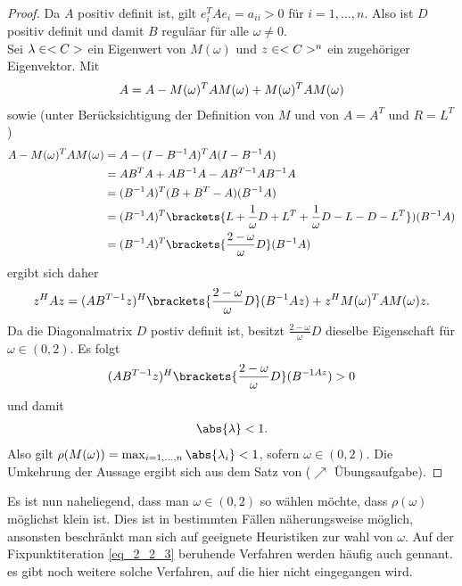 \begin{proof}
	Da $A$ positiv definit ist, gilt $e_i^TA e_i = a_{ii} > 0$ für $i = 1, \dots, n$. Also ist $D$ positiv definit und damit $B$ reguläar für alle $\omega \neq 0$.\\
	Sei $\lambda \in <C>$ ein Eigenwert von $M(\omega)$ und $z \in <C>^n$ ein zugehöriger Eigenvektor. Mit
	\begin{align}
		A = A - M(\omega)^T AM(\omega) + M(\omega)^T AM(\omega) \notag
	\end{align}
	sowie (unter Berücksichtigung der Definition von $M$ und von $A = A^T$ und $R = L^T$)
	\begin{align}
	A - M(\omega)^T AM(\omega) 
	&= A - (I - B^{-1}A)^T A(I-B^{-1}A)\notag\\
	&= AB^T A + AB^{-1}A - AB^{T-1}AB^{-1}A\notag\\
	&= (B^{-1}A)^T (B + B^T - A)(B^{-1}A)\notag\\
	&= (B^{-1}A)^T \brackets{L + \frac{1}{\omega}D + L^T + \frac{1}{\omega}D - L - D - L^T})(B^{-1}A)\notag\\
	&= (B^{-1}A)^T\brackets{\frac{2 -\omega}{\omega}D}(B^{-1}A)\notag
	\end{align}
	ergibt sich daher
	\begin{align}
		z^H Az = (AB^{T-1}z)^H\brackets{\frac{2 -\omega}{\omega}D}(B^{-1}Az) + z^H M(\omega)^T AM(\omega)z.\notag
	\end{align}
	Da die Diagonalmatrix $D$ postiv definit ist, besitzt $\frac{2-\omega}{\omega}D$ dieselbe Eigenschaft für $\omega \in (0,2)$. Es folgt
	\begin{align}
		(AB^{T-1}z)^H \brackets{\frac{2 -\omega}{\omega}D} (B^{-1 Az}) > 0 \notag
	\end{align}
	und damit
	\begin{align}
		\abs{\lambda} < 1.
	\end{align}
	Also gilt $\rho(M(\omega)) = \max_{i = 1,\dots,n}\abs{\lambda_i} < 1$, sofern $\omega \in (0,2)$. Die Umkehrung der Aussage ergibt sich aus dem Satz von  ($\nearrow$ Übungsaufgabe). %
\end{proof}

Es ist nun naheliegend, dass man $\omega \in(0,2)$ so wählen möchte, dass $\rho(\omega)$ möglichst klein ist. Dies ist in bestimmten Fällen näherungsweise möglich, ansonsten beschränkt man sich auf geeignete Heuristiken zur wahl von $\omega$. Auf der Fixpunktiteration \eqref{eq_2_2_3} beruhende Verfahren werden häufig auch  gennant. es gibt noch weitere solche Verfahren, auf die hier nicht eingegangen wird.